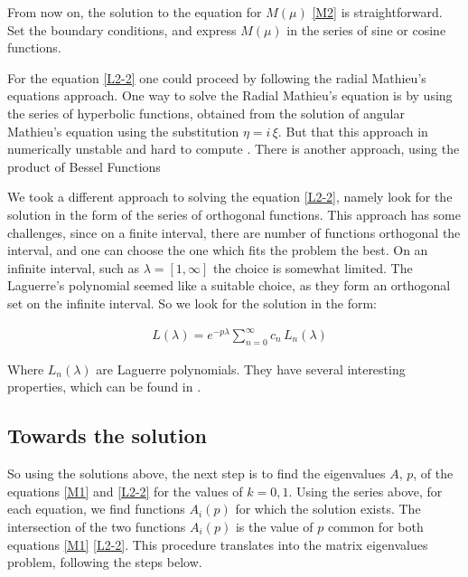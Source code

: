 From now on, the solution to the equation for $ M(\mu) $ \eqref{M2} is straightforward. Set the boundary conditions, and express  $ M(\mu) $ in the series of sine or cosine functions.

For the equation \eqref{L2-2} one could proceed by following the radial Mathieu's equations approach. One way to solve the Radial Mathieu's equation is by using the series of hyperbolic functions, obtained from the solution of angular Mathieu's equation using the substitution $ \eta = i\,\xi$.  But that this approach in numerically unstable and hard to compute \cite{Mathieu4}. There is another approach, using the product of Bessel Functions \cite{Mathieu4}

We took a different approach to solving the equation \eqref{L2-2}, namely look for the solution in the form of the series of orthogonal functions. This approach has some challenges, since on a finite interval, there are number of functions orthogonal the interval, and one can choose the one which fits the problem the best. On an infinite interval, such as $ \lambda = [1, \infty] $ the choice is somewhat limited. The Laguerre's polynomial seemed like a suitable choice, as they form an orthogonal set on the infinite interval. So we look for the solution in the form:

\begin{equation}\label{Lsol1}
\begin{split}
& L(\lambda) =  e^{-p\lambda}\sum_{n=0}^{\infty}{c_n\,L_n(\lambda)}
\end{split}
\end{equation}

Where $ L_n(\lambda) $ are Laguerre polynomials. They have several interesting properties, which can be found in \cite{Laguerre1}.

\subsection{ Towards the solution }

So using the solutions above, the next step is to find the eigenvalues $ A $, $ p $, of the equations \eqref{M1} and \eqref{L2-2} for the values of $ k = 0,1 $. Using the series above, for each equation, we find functions $ A_i(p) $ for which the solution exists. The intersection of the two functions $ A_i(p) $ is the value of $ p $ common for both equations \eqref{M1} \eqref{L2-2}. This procedure translates into the matrix eigenvalues problem, following the steps below.

